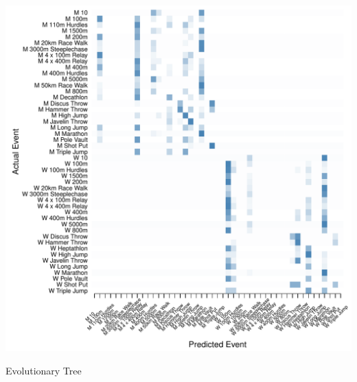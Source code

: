 \documentclass[landscape, paperwidth=42in, paperheight=36in,
fontscale=.35, margin=1in]{baposter}
\begin{document}
\begin{poster}
{\begin{center}
\begin{minipage}{0.45\textwidth}
\begin{center}
      \includegraphics[scale=0.27]{../graphics/athletesEV-tst.pdf}
    \end{center}
  \end{minipage}
  Evolutionary Tree \\



\end{center}}
\end{poster}
\end{document}
